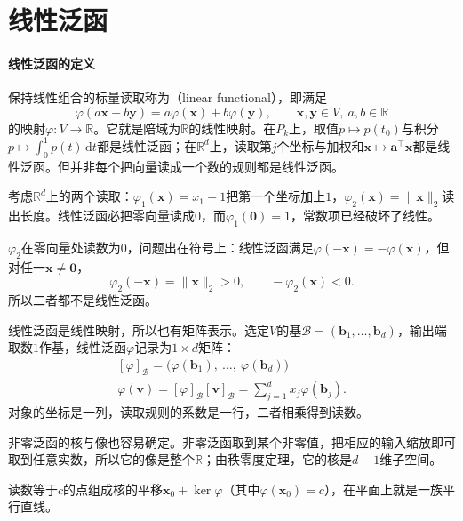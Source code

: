 
\section{线性泛函}
\label{sec:ls-dual-space}
\label{sec:ls-dual-spaces}

\paragraph{线性泛函的定义}
保持线性组合的标量读取称为（linear functional），即满足
\[
\varphi(a\bm x+b\bm y)=a\varphi(\bm x)+b\varphi(\bm y),\qquad\bm x,\bm y\in V,\ a,b\in\mathbb R
\]
的映射$\varphi:V\to\mathbb R$。它就是陪域为$\mathbb R$的线性映射。在$P_k$上，取值$p\mapsto p(t_0)$与积分$p\mapsto\int_0^1p(t)\,\mathrm dt$都是线性泛函；在$\mathbb R^d$上，读取第$j$个坐标与加权和$\bm x\mapsto\bm a^\top\bm x$都是线性泛函。但并非每个把向量读成一个数的规则都是线性泛函。
\begin{example}[反例：两个非线性的读取]
\label{ex:ls-nonlinear-readouts}
考虑$\mathbb R^d$上的两个读取：$\varphi_1(\bm x)=x_1+1$把第一个坐标加上$1$，$\varphi_2(\bm x)=\lVert\bm x\rVert_2$读出长度。线性泛函必把零向量读成$0$，而$\varphi_1(\bm0)=1$，常数项已经破坏了线性。

$\varphi_2$在零向量处读数为$0$，问题出在符号上：线性泛函满足$\varphi(-\bm x)=-\varphi(\bm x)$，但对任一$\bm x\neq\bm0$，
\[
 \varphi_2(-\bm x)=\lVert\bm x\rVert_2>0,\qquad -\varphi_2(\bm x)<0 .
\]
所以二者都不是线性泛函。
\end{example}

线性泛函是线性映射，所以也有矩阵表示。选定$V$的基$\mathcal B=(\bm b_1,\ldots,\bm b_d)$，输出端取数$1$作基，线性泛函$\varphi$记录为$1\times d$矩阵：
\[
 \begin{gathered}
[\varphi]_{\mathcal B}=\bigl(\varphi(\bm b_1),\ \ldots,\ \varphi(\bm b_d)\bigr)\\
\varphi(\bm v)=[\varphi]_{\mathcal B}[\bm v]_{\mathcal B}=\sum_{j=1}^dx_j\varphi(\bm b_j).
 \end{gathered}
\]
对象的坐标是一列，读取规则的系数是一行，二者相乘得到读数。

非零泛函的核与像也容易确定。非零泛函取到某个非零值，把相应的输入缩放即可取到任意实数，所以它的像是整个$\mathbb R$；由秩零度定理，它的核是$d-1$维子空间。

读数等于$c$的点组成核的平移$\bm x_0+\ker\varphi$（其中$\varphi(\bm x_0)=c$），在平面上就是一族平行直线。

